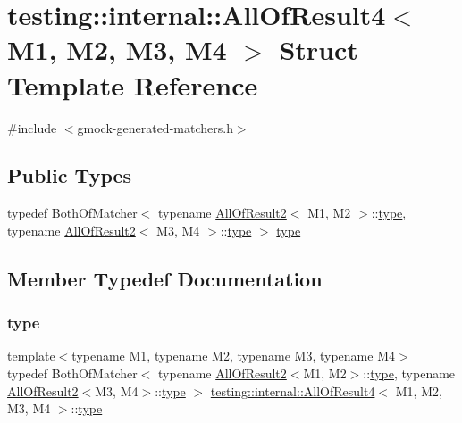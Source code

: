 \hypertarget{structtesting_1_1internal_1_1_all_of_result4}{}\section{testing\+::internal\+::All\+Of\+Result4$<$ M1, M2, M3, M4 $>$ Struct Template Reference}
\label{structtesting_1_1internal_1_1_all_of_result4}


{\ttfamily \#include $<$gmock-\/generated-\/matchers.\+h$>$}

\subsection*{Public Types}
\begin{DoxyCompactItemize}
\item 
typedef Both\+Of\+Matcher$<$ typename \mbox{\hyperlink{structtesting_1_1internal_1_1_all_of_result2}{All\+Of\+Result2}}$<$ M1, M2 $>$\+::\mbox{\hyperlink{structtesting_1_1internal_1_1_all_of_result4_ab277e20178bac632d4e5a39a1a407bbf}{type}}, typename \mbox{\hyperlink{structtesting_1_1internal_1_1_all_of_result2}{All\+Of\+Result2}}$<$ M3, M4 $>$\+::\mbox{\hyperlink{structtesting_1_1internal_1_1_all_of_result4_ab277e20178bac632d4e5a39a1a407bbf}{type}} $>$ \mbox{\hyperlink{structtesting_1_1internal_1_1_all_of_result4_ab277e20178bac632d4e5a39a1a407bbf}{type}}
\end{DoxyCompactItemize}


\subsection{Member Typedef Documentation}
\mbox{\label{structtesting_1_1internal_1_1_all_of_result4_ab277e20178bac632d4e5a39a1a407bbf}} 
\subsubsection{\texorpdfstring{type}{type}}
{\footnotesize\ttfamily template$<$typename M1, typename M2, typename M3, typename M4$>$ \\
typedef Both\+Of\+Matcher$<$ typename \mbox{\hyperlink{structtesting_1_1internal_1_1_all_of_result2}{All\+Of\+Result2}}$<$M1, M2$>$\+::\mbox{\hyperlink{structtesting_1_1internal_1_1_all_of_result4_ab277e20178bac632d4e5a39a1a407bbf}{type}}, typename \mbox{\hyperlink{structtesting_1_1internal_1_1_all_of_result2}{All\+Of\+Result2}}$<$M3, M4$>$\+::\mbox{\hyperlink{structtesting_1_1internal_1_1_all_of_result4_ab277e20178bac632d4e5a39a1a407bbf}{type}} $>$ \mbox{\hyperlink{structtesting_1_1internal_1_1_all_of_result4}{testing\+::internal\+::\+All\+Of\+Result4}}$<$ M1, M2, M3, M4 $>$\+::\mbox{\hyperlink{structtesting_1_1internal_1_1_all_of_result4_ab277e20178bac632d4e5a39a1a407bbf}{type}}}



